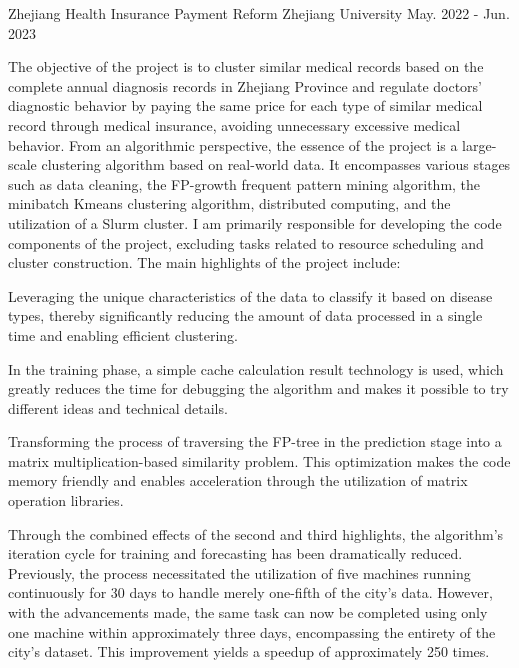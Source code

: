 
\begin{cventries}
	\cventry
	{} %
	{Zhejiang Health Insurance Payment Reform} %
	{Zhejiang University} %
	{May. 2022 - Jun. 2023} %
	{
		The objective of the project is to cluster similar medical records based on the complete annual diagnosis records in Zhejiang Province and regulate doctors' diagnostic behavior by paying the same price for each type of similar medical record through medical insurance, avoiding unnecessary excessive medical behavior. \newline
		From an algorithmic perspective, the essence of the project is a large-scale clustering algorithm based on real-world data. It encompasses various stages such as data cleaning, the FP-growth frequent pattern mining algorithm, the minibatch Kmeans clustering algorithm, distributed computing, and the utilization of a Slurm cluster. I am primarily responsible for developing the code components of the project, excluding tasks related to resource scheduling and cluster construction. \newline
		The main highlights of the project include: \newline
		\vspace{3.5mm}
		\begin{cvitems} %
			\item{Leveraging the unique characteristics of the data to classify it based on disease types, thereby significantly reducing the amount of data processed in a single time and enabling efficient clustering.}
			\item{In the training phase, a simple cache calculation result technology is used, which greatly reduces the time for debugging the algorithm and makes it possible to try different ideas and technical details.}
			\item{Transforming the process of traversing the FP-tree in the prediction stage into a matrix multiplication-based similarity problem. This optimization makes the code memory friendly and enables acceleration through the utilization of matrix operation libraries.}
			\item {Through the combined effects of the second and third highlights, the algorithm's iteration cycle for training and forecasting has been dramatically reduced. Previously, the process necessitated the utilization of five machines running continuously for 30 days to handle merely one-fifth of the city's data. However, with the advancements made, the same task can now be completed using only one machine within approximately three days, encompassing the entirety of the city's dataset. This improvement yields a speedup of approximately 250 times.}
		\end{cvitems}
	}


\end{cventries}
